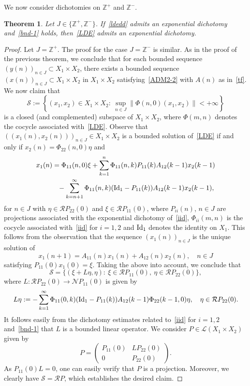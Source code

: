 \documentclass[11pt,reqno,a4paper]{amsart}
\theoremstyle{plain}
\numberwithin{equation}{section}
\newtheorem{theorem}{Theorem}
\theoremstyle{remark}
\def\Id{\text{\rm Id}}
\def\Z{\mathbb{Z}}
\begin{document}
We now consider dichotomies on $\Z^+$ and $\Z^-$. 
\begin{theorem}\label{129thm}
Let $J \in \{\Z^+,\Z^-\}$. If~\eqref{ldedd} admits an exponential dichotomy and~\eqref{bnd-1} holds, 
then~\eqref{LDE} admits an exponential dichotomy.
\end{theorem}

\begin{proof}
Let $J=\Z^+.$ The proof for the case $J=\Z^-$ is similar. As in the proof of the previous theorem, we conclude that for each bounded sequence $(y(n))_{n\in J}\subset X_1\times X_2$, there exists a bounded sequence $(x(n))_{n\in J}\subset X_1\times X_2$ in $X_1 \times X_2$ satisfying~\eqref{ADM2-2} with $A(n)$ as in~\eqref{tf}. We now claim that 
\begin{equation}\label{S}
\mathcal S:=\left \{(x_1, x_2)\in X_1\times X_2: \ \sup_{n\in J} \|\Phi(n, 0)(x_1, x_2) \|<+\infty \right \}
\end{equation}
is a closed (and complemented) subspace of $X_1\times X_2$, where $\Phi(m, n)$ denotes the cocycle associated with~\eqref{LDE}.
Observe that $((x_1(n), x_2(n)))_{n\in J}\in X_1\times X_2$ is a bounded solution of~\eqref{LDE} if and only if $x_2(n)=\Phi_{22}(n, 0)\eta$ and 
\[
\begin{split}
x_1(n) &=\Phi_{11}(n, 0)\xi+\sum_{k=1}^n \Phi_{11}(n, k)P_{11}(k)A_{12}(k-1)x_2(k-1) \\
&\phantom{=}-\sum_{k=n+1}^\infty \Phi_{11}(n, k)(\Id_1-P_{11}(k))A_{12}(k-1)x_2(k-1),
\end{split}
\]
for $n\in J$ with $\eta \in \mathcal RP_{22}(0)$ and $\xi \in \mathcal RP_{11}(0)$, where $P_{ii}(n)$, $n\in J$ are projections associated with the exponential dichotomy of~\eqref{iid}, $\Phi_{ii}(m, n)$ is the cocycle associated with~\eqref{iid} for $i=1, 2$ and $\Id_1$ denotes the identity on $X_1$. This follows from the observation that the sequence $(x_1(n))_{n\in J}$ is the unique solution of 
\[
x_1(n+1)=A_{11}(n)x_1(n)+A_{12}(n)x_2(n), \quad n\in J
\]
satisfying $P_{11}(0)x_1(0)=\xi$. Taking the above into account, we conclude that \[
\mathcal S=\{(\xi+L\eta, \eta): \ \xi\in \mathcal RP_{11}(0), \ \eta\in \mathcal RP_{22}(0) \},
\]
where $L\colon \mathcal RP_{22}(0)\to \mathcal NP_{11}(0)$ is given by 
\[
L\eta:=-\sum_{k=1}^\infty \Phi_{11}(0, k)(\Id_1-P_{11}(k))A_{12}(k-1)\Phi_{22}(k-1, 0)\eta, \quad \eta \in \mathcal RP_{22}(0).
\]
It follows easily from the dichotomy estimates related to~\eqref{iid} for $i=1, 2$ and~\eqref{bnd-1} that $L$ is a bounded linear operator. We consider $P\in \mathcal L(X_1\times X_2)$ given by 
\[
P=\begin{pmatrix}
P_{11}(0) & LP_{22}(0) \\
0& P_{22}(0)
\end{pmatrix}.
\]
As $P_{11}(0)L=0$, one can easily verify that $P$ is a projection. Moreover, we clearly have $\mathcal S=\mathcal RP$, which establishes the desired claim. \end{proof}
\end{document}
